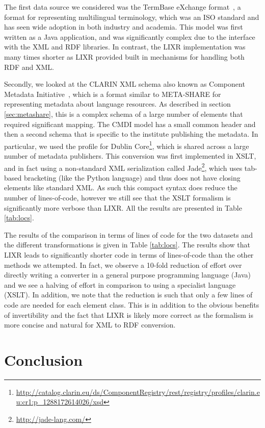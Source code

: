\documentclass{acm_proc_article-sp}
\begin{document}
The first data source we considered was the
TermBase eXchange format~\cite[TBX]{iso30042}, a format for representing multilingual
terminology, which was an ISO standard and has seen wide adoption in both industry
and academia. This model was first written as a Java application, and was significantly
complex due to the interface with the XML and RDF libraries. In contrast, the LIXR 
implementation was many times shorter as LIXR provided built in mechanisms for 
handling both RDF and XML. 


Secondly, we looked at the CLARIN XML schema also known as
Component Metadata Initiative~\cite{broeder2012cmdi}, which is a format similar
to META-SHARE for representing metadata about language resources. As described
in section \ref{sec:metashare}, this is a complex schema of a large number of 
elements that required significant mapping.
The CMDI model
has a small common header and then a second schema that is specific to the
institute publishing the metadata. In particular, we used the profile for 
Dublin Core\footnote{\url{http://catalog.clarin.eu/ds/ComponentRegistry/rest/registry/profiles/clarin.eu:cr1:p\_1288172614026/xsd}},
which is shared across a large number of metadata publishers. This conversion
was first implemented in XSLT, and in fact using a non-standard XML serialization
called Jade\footnote{\url{http://jade-lang.com/}}, which uses tab-based bracketing 
(like the Python language) and thus does not have closing elements like standard XML.
As such this compact syntax does reduce the number of lines-of-code, however we 
still see that the XSLT formalism is significantly more verbose than LIXR. All
the results are presented in Table \ref{tab:locs}. 

The results of the comparison in terms of lines of code for the two datasets and the different transformations is given in Table \ref{tab:locs}.
The results show that 
LIXR leads to significantly shorter code in terms of lines-of-code than the other methods
we attempted. In fact, we observe a 10-fold reduction of effort over directly
writing a converter in a general purpose programming language (Java) and we see
a halving of effort in comparison to using a specialist language (XSLT). In
addition, we note that the reduction is such that only a few lines of code are
needed for each element class.
This is in addition to the obvious benefits of invertibility and
the fact that LIXR is likely more correct as the formalism is more concise and 
natural for XML to RDF conversion. 

\section{Conclusion}
\label{sec:conclusion}
\end{document}
